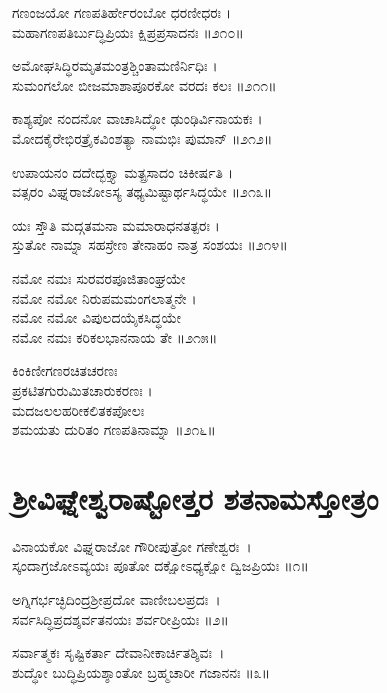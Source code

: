 ಗಣಂಜಯೋ ಗಣಪತಿರ್ಹೇರಂಬೋ ಧರಣೀಧರಃ ।\\
ಮಹಾಗಣಪತಿರ್ಬುದ್ಧಿಪ್ರಿಯಃ ಕ್ಷಿಪ್ರಪ್ರಸಾದನಃ ॥೨೧೦॥

ಅಮೋಘಸಿದ್ಧಿರಮೃತಮಂತ್ರಶ್ಚಿಂತಾಮಣಿರ್ನಿಧಿಃ ।\\
ಸುಮಂಗಲೋ ಬೀಜಮಾಶಾಪೂರಕೋ ವರದಃ ಕಲಃ ॥೨೧೧॥

ಕಾಶ್ಯಪೋ ನಂದನೋ ವಾಚಾಸಿದ್ಧೋ ಢುಂಢಿರ್ವಿನಾಯಕಃ ।\\
ಮೋದಕೈರೇಭಿರತ್ರೈಕವಿಂಶತ್ಯಾ ನಾಮಭಿಃ ಪುಮಾನ್ ॥೨೧೨॥

ಉಪಾಯನಂ ದದೇದ್ಭಕ್ತ್ಯಾ ಮತ್ಪ್ರಸಾದಂ ಚಿಕೀರ್ಷತಿ ।\\
ವತ್ಸರಂ ವಿಘ್ನರಾಜೋಽಸ್ಯ ತಥ್ಯಮಿಷ್ಟಾರ್ಥಸಿದ್ಧಯೇ ॥೨೧೩॥

ಯಃ ಸ್ತೌತಿ ಮದ್ಗತಮನಾ ಮಮಾರಾಧನತತ್ಪರಃ ।\\
ಸ್ತುತೋ ನಾಮ್ನಾ ಸಹಸ್ರೇಣ ತೇನಾಹಂ ನಾತ್ರ ಸಂಶಯಃ ॥೨೧೪॥

ನಮೋ ನಮಃ ಸುರವರಪೂಜಿತಾಂಘ್ರಯೇ\\
ನಮೋ ನಮೋ ನಿರುಪಮಮಂಗಲಾತ್ಮನೇ ।\\
ನಮೋ ನಮೋ ವಿಪುಲದಯೈಕಸಿದ್ಧಯೇ\\
ನಮೋ ನಮಃ ಕರಿಕಲಭಾನನಾಯ ತೇ ॥೨೧೫॥

ಕಿಂಕಿಣೀಗಣರಚಿತಚರಣಃ\\
ಪ್ರಕಟಿತಗುರುಮಿತಚಾರುಕರಣಃ ।\\
ಮದಜಲಲಹರೀಕಲಿತಕಪೋಲಃ\\
ಶಮಯತು ದುರಿತಂ ಗಣಪತಿನಾಮ್ನಾ ॥೨೧೬॥
\section{ಶ್ರೀವಿಘ್ನೇಶ್ವರಾಷ್ಟೋತ್ತರ ಶತನಾಮಸ್ತೋತ್ರಂ}

ವಿನಾಯಕೋ ವಿಘ್ನರಾಜೋ ಗೌರೀಪುತ್ರೋ ಗಣೇಶ್ವರಃ~।\\
ಸ್ಕಂದಾಗ್ರಜೋಽವ್ಯಯಃ ಪೂತೋ ದಕ್ಷೋಽಧ್ಯಕ್ಷೋ ದ್ವಿಜಪ್ರಿಯಃ ॥೧॥

ಅಗ್ನಿಗರ್ಭಚ್ಛಿದಿಂದ್ರಶ್ರೀಪ್ರದೋ ವಾಣೀಬಲಪ್ರದಃ~।\\
ಸರ್ವಸಿದ್ಧಿಪ್ರದಶ್ಶರ್ವತನಯಃ ಶರ್ವರೀಪ್ರಿಯಃ ॥೨॥

ಸರ್ವಾತ್ಮಕಃ ಸೃಷ್ಟಿಕರ್ತಾ ದೇವಾನೀಕಾರ್ಚಿತಶ್ಶಿವಃ~।\\
ಶುದ್ಧೋ ಬುದ್ಧಿಪ್ರಿಯಶ್ಶಾಂತೋ ಬ್ರಹ್ಮಚಾರೀ ಗಜಾನನಃ ॥೩॥

